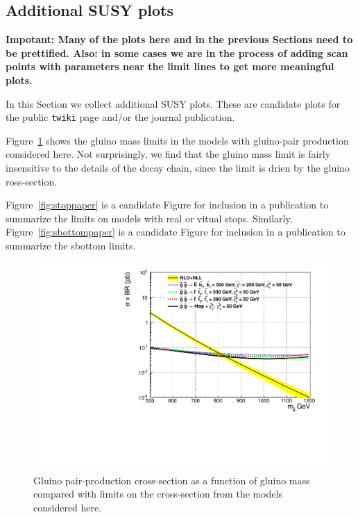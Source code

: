 


\subsection{Additional SUSY plots}
\label{sec:moreSUSYplos}

{\bf Impotant: Many of the plots here and in the previous Sections
need to be prettified.  Also: in some cases we are in the
process of adding scan points with parameters near the limit 
lines to get more meaningful plots.}


In this Section we collect additional SUSY plots.  These are 
candidate plots for the public {\tt twiki} page and/or the 
journal publication.

Figure~\ref{fig:gluinoLimit1d} shows the gluino mass limits
in the models with gluino-pair production considered here.
Not surprisingly,
we find that the gluino mass limit is fairly insensitive 
to the details of the decay chain, since the limit
is drien by the gluino ross-section.

Figure~\ref{fig:stoppaper} is a candidate Figure for inclusion
in a publication to summarize the limits on models 
with real or vitual stops.
Similarly, Figure~\ref{fig:sbottompaper} is a candidate Figure for inclusion
in a publication to summarize the sbottom limits.



\begin{figure}[htb]
\begin{center}
\includegraphics[width=0.48\linewidth]{figs/gluino_1d.pdf}
\caption{Gluino pair-production cross-section
as a function of gluino mass compared with limits
on the cross-section from the models considered here.
\label{fig:gluinoLimit1d}}
\end{center}
\end{figure}





